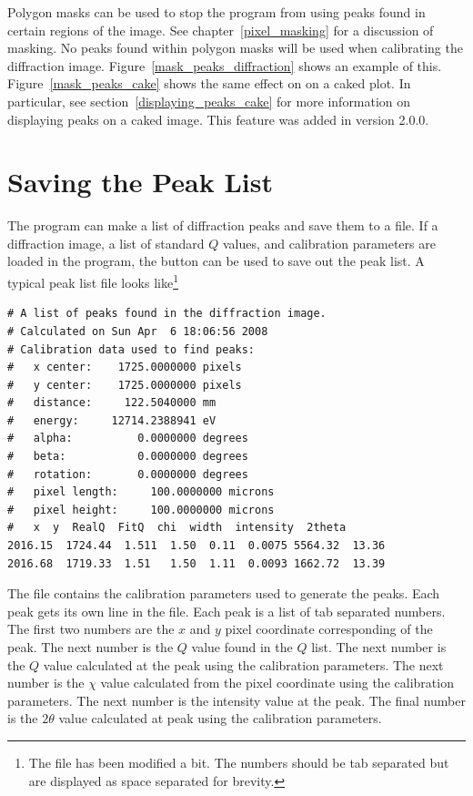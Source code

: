 Polygon masks can be used to stop the program from using peaks 
found in certain regions of the image. See chapter~\ref{pixel_masking} 
for a discussion of masking. No peaks found within polygon masks
will be used when calibrating the diffraction image.
Figure~\ref{mask_peaks_diffraction} shows an example of this. 
Figure~\ref{mask_peaks_cake} shows the same effect on on a caked 
plot. In 
particular, see section~\ref{displaying_peaks_cake} for more 
information on displaying peaks on a caked image. This feature was 
added in version 2.0.0.

\section{Saving the Peak List}

The program can make a list of diffraction peaks and 
save them to a file. If a diffraction image, a list of
standard $Q$ values, and calibration parameters are loaded
in the program, the  button can
be used to save out the peak list. 
A typical peak list file looks like\footnote{The file
has been modified a bit. The numbers should be tab 
separated but are displayed as space separated for brevity.}
\begin{lstlisting}[basicstyle=\ttfamily\tiny]
# A list of peaks found in the diffraction image.
# Calculated on Sun Apr  6 18:06:56 2008
# Calibration data used to find peaks:
#   x center:    1725.0000000 pixels
#   y center:    1725.0000000 pixels
#   distance:     122.5040000 mm
#   energy:     12714.2388941 eV
#   alpha:          0.0000000 degrees
#   beta:           0.0000000 degrees
#   rotation:       0.0000000 degrees
#   pixel length:     100.0000000 microns
#   pixel height:     100.0000000 microns
#   x  y  RealQ  FitQ  chi  width  intensity  2theta
2016.15  1724.44  1.511  1.50  0.11  0.0075 5564.32  13.36
2016.68  1719.33  1.51   1.50  1.11  0.0093 1662.72  13.39
\end{lstlisting}
The file contains the calibration parameters
used to generate the peaks. Each peak gets its
own line in the file. Each peak is a list of 
tab separated numbers. The first two numbers are
the $x$ and $y$ pixel coordinate corresponding of
the peak. The next number is the $Q$ value found in the 
$Q$ list. The next number is the $Q$ value calculated 
at the peak using the calibration
parameters. The next number is the $\chi$ value calculated 
from the pixel coordinate using the calibration parameters. 
The next number is the intensity value at the peak. The final
number is the $2\theta$ value calculated at peak using 
the calibration parameters.

